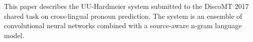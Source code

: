 This paper describes the UU-Hardmeier system submitted to the DiscoMT 2017 shared task on cross-lingual pronoun prediction. The system is an ensemble of convolutional neural networks combined with a source-aware n-gram language model.
